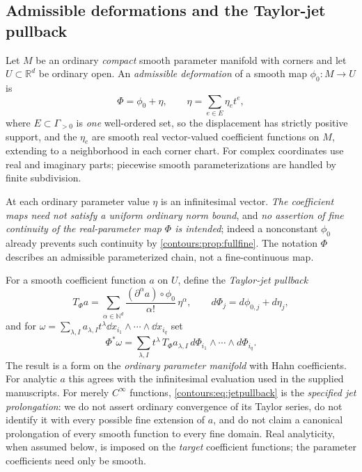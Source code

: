\documentclass[11pt,letterpaper]{article}
\theoremstyle{definition}
\theoremstyle{remark}
\newcommand{\R}{\mathbb R}\newcommand{\C}{\mathbb C}\newcommand{\Q}{\mathbb Q}
\newcommand{\N}{\mathbb N}\newcommand{\Z}{\mathbb Z}\newcommand{\DD}{\mathbb D}
\numberwithin{equation}{section}
\begin{document}
\subsection{Admissible deformations and the Taylor-jet pullback}
\begin{definition}
\label{contours:def:deformation}
Let $M$ be an ordinary \emph{compact} smooth parameter manifold with corners and
let $U\subset\R^d$ be ordinary open. An \emph{admissible deformation} of a smooth
map $\phi_0:M\to U$ is
\begin{equation}\label{contours:eq:deformedmap}
  \Phi=\phi_0+\eta,\qquad
  \eta=\sum_{e\in E}\eta_e t^e ,
\end{equation}
where $E\subset\Gamma_{>0}$ is \emph{one} well-ordered set, so the displacement has
strictly positive support, and the $\eta_e$ are smooth real vector-valued
coefficient functions on $M$, extending to a neighborhood in each corner chart. For
complex coordinates use real and imaginary parts; piecewise smooth
parameterizations are handled by finite subdivision.
\end{definition}

At each ordinary parameter value $\eta$ is an infinitesimal vector. \emph{The
coefficient maps need not satisfy a uniform ordinary norm bound}, and \emph{no
assertion of fine continuity of the real-parameter map $\Phi$ is intended}; indeed
a nonconstant $\phi_0$ already prevents such continuity by
\cref{contours:prop:fullfine}. The notation $\Phi$ describes an admissible
parameterized chain, not a fine-continuous map.

For a smooth coefficient function $a$ on $U$, define the \emph{Taylor-jet pullback}
\begin{equation}\label{contours:eq:jetpullback}
  T_\Phi a=\sum_{\alpha\in\N^d}
  \frac{(\partial^\alpha a)\circ\phi_0}{\alpha!}\,\eta^\alpha ,
  \qquad
  d\Phi_j=d\phi_{0,j}+d\eta_j ,
\end{equation}
and for $\omega=\sum_{\lambda,I}a_{\lambda,I}t^\lambda \dd x_{i_1}\wedge\cdots\wedge
\dd x_{i_q}$ set
\begin{equation}\label{contours:eq:formpullback}
  \Phi^*\omega=\sum_{\lambda,I}t^\lambda\,T_\Phi a_{\lambda,I}\,
  d\Phi_{i_1}\wedge\cdots\wedge d\Phi_{i_q} .
\end{equation}
The result is a form on the \emph{ordinary parameter manifold} with Hahn
coefficients. For analytic $a$ this agrees with the infinitesimal evaluation used
in the supplied manuscripts. For merely $C^\infty$ functions,
\eqref{contours:eq:jetpullback} is the \emph{specified jet prolongation}: we do not
assert ordinary convergence of its Taylor series, do not identify it with every
possible fine extension of $a$, and do not claim a canonical prolongation of every
smooth function to every fine domain. Real analyticity, when assumed below, is
imposed on the \emph{target} coefficient functions; the parameter coefficients need
only be smooth.
\end{document}
